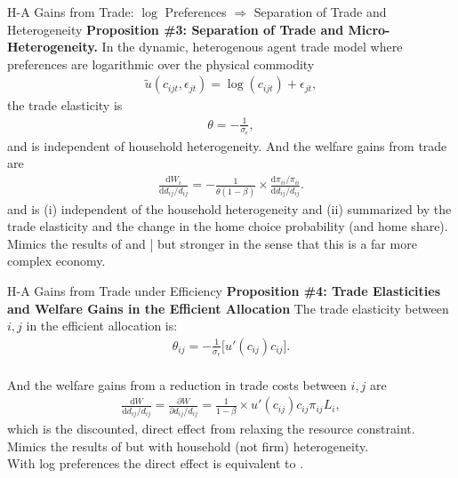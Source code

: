 \documentclass[9pt,pdftex,aspectratio=1610]{beamer}
\theoremstyle{definition}
\begin{document}
\begin{frame}[t]{H-A Gains from Trade: $\log$ Preferences $\Rightarrow$ Separation of Trade and Heterogeneity}
\smallskip
\textbf{Proposition \#3: Separation of Trade and Micro-Heterogeneity.} In the dynamic, heterogenous agent trade model where preferences are logarithmic over the physical commodity
\begin{align}
\tilde{u}( c_{ijt}, \epsilon_{jt} ) =  \log(c_{ijt}) + \epsilon_{jt}, \nonumber
\end{align}
the trade elasticity is
\begin{align}
\theta = -\frac{1}{\sigma_{\epsilon}}, \nonumber
\end{align}
and is independent of household heterogeneity. And the welfare gains from trade are
\begin{align}
\frac{\mathrm{d} W_{i}}{\mathrm{d} d_{ij} / d_{ij}} = -\frac{1}{\theta (1-\beta)} \times \frac{\mathrm{d} \pi_{ii} / \pi_{ii}}{\mathrm{d}d_{ij} / d_{ij}}. \nonumber
\end{align}
and is (i) independent of the household heterogeneity and (ii) summarized by the trade elasticity and the change in the home choice probability (and home share).\\
\bigskip
\medskip
Mimics the results of \citet{anderson1987ces} and \citet{arkolakis2012new}| but stronger in the sense that this is a far more complex economy.
\end{frame}


\begin{frame}[t]{H-A Gains from Trade under Efficiency}
\smallskip
\textbf{Proposition \#4: Trade Elasticities and Welfare Gains in the Efficient Allocation} The trade elasticity between $i,j$ in the efficient allocation is:
\begin{align}
\theta_{ij} =  -\frac{1}{\sigma_{\epsilon}} \bigg [ u'(c_{ij}) c_{ij} \bigg]. \nonumber
\end{align}\\
\bigskip
And the welfare gains from a reduction in trade costs between $i,j$ are
\begin{align}
\frac{\mathrm{d} W}{\mathrm{d} d_{ij} / d_{ij}} = \frac{\partial W}{\partial d_{ij} / d_{ij}} = \frac{1}{1-\beta} \times u'(c_{ij}) c_{ij} \pi_{ij} L_i, \nonumber
\end{align}
which is the discounted, direct effect from relaxing the resource constraint.\\
\bigskip
\medskip
Mimics the results of \citet{AtkesonBurstein2010} but with household (not firm) heterogeneity.\\
\bigskip
With log preferences the direct effect is equivalent to \citet*{arkolakis2012new}.
\end{frame}
\end{document}
